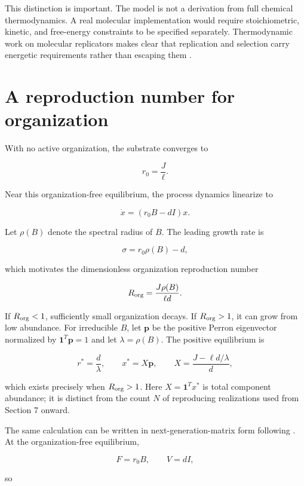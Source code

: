 \documentclass[11pt,a4paper]{article}
\begin{document}
This distinction is important. The model is not a derivation from full
chemical thermodynamics. A real molecular implementation would require
stoichiometric, kinetic, and free-energy constraints to be specified
separately. Thermodynamic work on molecular replicators makes clear that
replication and selection carry energetic requirements rather than
escaping them \citep{Kolchinsky2025}.

\section{A reproduction number for
organization}\label{a-reproduction-number-for-organization}

With no active organization, the substrate converges to

\[
r_0 = \frac{J}{\ell}.
\]

Near this organization-free equilibrium, the process dynamics linearize
to

\[
\dot{x} = (r_0 B - dI)x.
\]

Let \(\rho(B)\) denote the spectral radius of \(B\). The leading growth
rate is

\[
\sigma = r_0 \rho(B) - d,
\]

which motivates the dimensionless organization reproduction number

\begin{equation}
R_{\rm org}=\frac{J\rho(B)}{\ell d}.
\label{eq:Rorg}
\end{equation}

If \(R_{\rm org} < 1\), sufficiently small organization decays. If
\(R_{\rm org} > 1\), it can grow from low abundance. For irreducible
\(B\), let \(\mathbf{p}\) be the positive Perron eigenvector normalized by
\(\mathbf{1}^T \mathbf{p} = 1\) and let \(\lambda = \rho(B)\). The positive
equilibrium is

\[
r^* = \frac{d}{\lambda}, \qquad x^* = X\mathbf{p}, \qquad X = \frac{J - \ell d/\lambda}{d},
\]

which exists precisely when \(R_{\rm org} > 1\). Here \(X = \mathbf{1}^T x^*\) is
total component abundance; it is distinct from the count \(N\) of reproducing
realizations used from Section 7 onward.

The same calculation can be written in next-generation-matrix form following \citet{VandenDriessche2002}. At the organization-free equilibrium,

\[
F = r_0 B, \qquad V = dI,
\]

so
\end{document}
